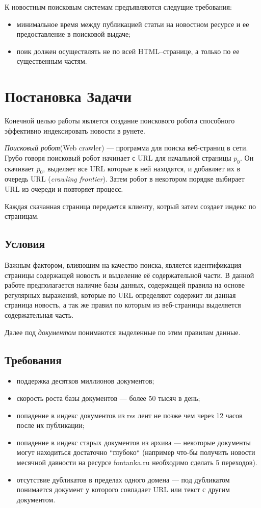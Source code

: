 К новостным поисковым системам предъявляются следущие требования:
\begin{itemize} 
\item минимальное время между публикацией статьи на новостном ресурсе и ее 
    предоставление в поисковой выдаче;
\item поик должен осуществлять не по всей HTML--странице, а только по ее 
    существенным частям. 
\end{itemize}

\section{Постановка Задачи}
Конечной целью работы является создание поискового робота способного эффективно индексировать новости в рунете.

\textit{Поисковый робот}(Web crawler) --- программа для поиска веб-страниц в сети\cite{crawl}. Грубо говоря поисковый робот начинает с URL для начальной страницы $p_{0}$.
 Он скачивает $p_{0}$, выделяет все URL которые в ней находятся, и добавляет их в очередь URL (\textit{crawling frontier}). Затем робот в некотором порядке выбирает URL из очереди и повторяет процесс.

Каждая скачанная страница передается клиенту, котрый затем создает индекс по страницам.
\subsection{Условия}
Важным фактором, влияющим на качество поиска, является идентификация страницы содержащей новость
 и выделение её содержательной части. В данной работе предполагается наличие базы данных,
 содержащей правила на основе регулярных выражений, которые по URL определяют содержит ли данная страница новость,
 а так же правил по которым из веб-страницы выделяется содержательная часть.

Далее под \textit{документом} понимаются выделенные по этим правилам данные.

\subsection{Требования}
\begin{itemize}
 \item поддержка десятков миллионов документов;
 \item скорость роста базы документов --- более 50 тысяч в день;
 \item попадение в индекс документов из rss лент не позже чем через 12 часов после их публикации;
 \item попадение в индекс старых документов из архива --- некоторые документы могут находиться достаточно ``глубоко`` (например что-бы получить новости месячной давности на ресурсе fontanka.ru необходимо сделать 5 переходов).
 \item отсутствие дубликатов в пределах одного домена --- под дубликатом понимается документ у которого совпадает URL или текст с другим документом.
\end{itemize}

